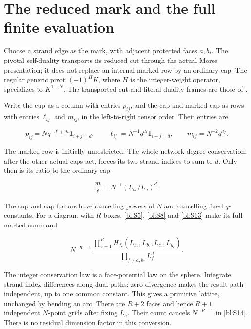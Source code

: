 \section{The reduced mark and the full finite evaluation}\label{bl:the-physical-mark-measure-and-normals}

Choose a strand edge as the mark, with adjacent protected faces
\(a,b_*\). The pivotal self-duality transports its reduced cut through
the actual Morse presentation; it does not replace an internal marked
row by an ordinary cap. The regular generic pivot \((-1)^HK\), where
\(H\) is the integer-weight operator, specializes to \(K^{1-N}\).
The transported cut and literal duality frames are those of
\cite[Section~9]{Finite}.

Write the cup as a column with entries $p_{ij}$, and the cap and
marked cap as rows with entries $\ell_{ij}$ and $m_{ij}$, in the
left-to-right tensor order. Their entries are

\begin{equation}\label{bl:S12}
p_{ij}=Nq^{-d^2+di}\mathbf1_{i+j=d},\qquad
 \ell_{ij}=N^{-1}q^{di}\mathbf1_{i+j=d},\qquad
 m_{ij}=N^{-2}q^{dj}.
\end{equation}

The marked row is initially unrestricted. The whole-network degree conservation, after the other actual caps act, forces its two strand indices to sum to \(d\). Only then is its ratio to the ordinary cap

\begin{equation}\label{bl:S13}
\frac m\ell=N^{-1}(L_{b_*}/L_a)^d .
\end{equation}

The cup and cap factors have cancelling powers of \(N\) and cancelling
fixed \(q\)-constants. For a diagram with \(R\) boxes,
\eqref{bl:S5}, \eqref{bl:S8} and \eqref{bl:S13} make its full marked summand

\begin{equation}\label{bl:S14}
N^{-R-1}\,
 \frac{\prod_{e=1}^{R}H_{f_e}(L_{x_e},L_{b_e},L_{c_e},L_{y_e})}
      {\prod_{f\ne a,b_*}L_f^d}.
\end{equation}

The integer conservation law is a face-potential law on the sphere.
Integrate strand-index differences along dual paths: zero divergence makes
the result path independent, up to one common constant. This gives a
primitive lattice, unchanged by bending an arc. There are \(R+2\)
faces and hence \(R+1\) independent \(N\)-point grids after fixing
\(L_a\). Their count cancels \(N^{-R-1}\) in \eqref{bl:S14}.
There is no residual dimension factor in this conversion.

